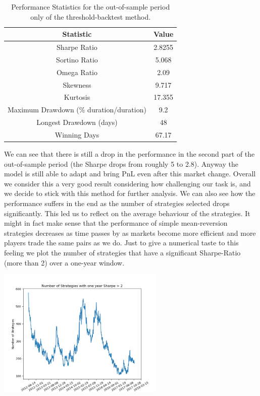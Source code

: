 \begin{table}
	\centering
	\begin{tabular}{c|c}
		\textbf{Statistic} & \textbf{Value} \\\hline
		Sharpe Ratio & 2.8255 \\ 
		Sortino Ratio & 5.068 \\ 
		Omega Ratio & 2.09 \\ 
		Skewness & 9.717 \\ 
		Kurtosis & 17.355 \\ 
		Maximum Drawdown (\% duration/duration) & 9.2 \\ 
		Longest Drawdown (days) & 48 \\ 
		Winning Days & 67.17 \\ 
	\end{tabular}
	\label{table:oos_perf_threshold_backtest}
	\caption{\label{table:oos_perf_threshold_backtest} Performance Statistics for the out-of-sample period only of the threshold-backtest method.}
\end{table}

We can see that there is still a drop in the performance in the second part of the out-of-sample period (the Sharpe drops from roughly 5 to 2.8). Anyway the model is still able to adapt and bring PnL even after this market change. Overall we consider this a very good result considering how challenging our task is, and we decide to stick with this method for further analysis. We can also see how the performance suffers in the end as the number of strategies selected drops significantly. This led us to reflect on the average behaviour of the strategies. It might in fact make sense that the performance of simple mean-reversion strategies decreases as time passes by as markets become more efficient and more players trade the same pairs as we do. Just to give a numerical taste to this feeling we plot the number of strategies that have a significant Sharpe-Ratio (more than 2) over a one-year window. 

\begin{center}
	\centering
	\includegraphics[width=0.6\textwidth]{Part_1/Number_of_Sharpes.png}
\end{center}

